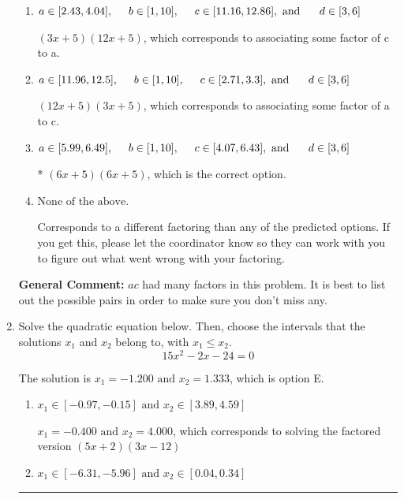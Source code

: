 \documentclass{extbook}[14pt]
\newcommand{\litem}[1]{\item #1

\rule{\textwidth}{0.4pt}}
\begin{document}
\begin{enumerate}
{\begin{enumerate}[label=\Alph*.]
 $(x + 30)(x + 30)$, which corresponds to factoring $x^{2} +60 x + 900$.
\item \( a \in [2.43, 4.04], \hspace*{5mm} b \in [1, 10], \hspace*{5mm} c \in [11.16, 12.86], \text{ and } \hspace*{5mm} d \in [3, 6] \)

 $(3x + 5)(12x + 5)$, which corresponds to associating some factor of c to a.
\item \( a \in [11.96, 12.5], \hspace*{5mm} b \in [1, 10], \hspace*{5mm} c \in [2.71, 3.3], \text{ and } \hspace*{5mm} d \in [3, 6] \)

 $(12x + 5)(3x + 5)$, which corresponds to associating some factor of a to c.
\item \( a \in [5.99, 6.49], \hspace*{5mm} b \in [1, 10], \hspace*{5mm} c \in [4.07, 6.43], \text{ and } \hspace*{5mm} d \in [3, 6] \)

* $(6x + 5)(6x + 5)$, which is the correct option.
\item \( \text{None of the above.} \)

 Corresponds to a different factoring than any of the predicted options. If you get this, please let the coordinator know so they can work with you to figure out what went wrong with your factoring.
\end{enumerate}

\textbf{General Comment:} $ac$ had many factors in this problem. It is best to list out the possible pairs in order to make sure you don't miss any.
}
\litem{
Solve the quadratic equation below. Then, choose the intervals that the solutions $x_1$ and $x_2$ belong to, with $x_1 \leq x_2$.
\[ 15x^{2} -2 x -24 = 0 \]

The solution is \( x_1 = -1.200 \text{ and } x_2 = 1.333 \), which is option E.\begin{enumerate}[label=\Alph*.]
\item \( x_1 \in [-0.97, -0.15] \text{ and } x_2 \in [3.89, 4.59] \)

$x_1 = -0.400 \text{ and } x_2 = 4.000$, which corresponds to solving the factored version $(5x + 2)(3x -12)$
\item \( x_1 \in [-6.31, -5.96] \text{ and } x_2 \in [0.04, 0.34] \)


\end{enumerate}}
\end{enumerate}
\end{document}
